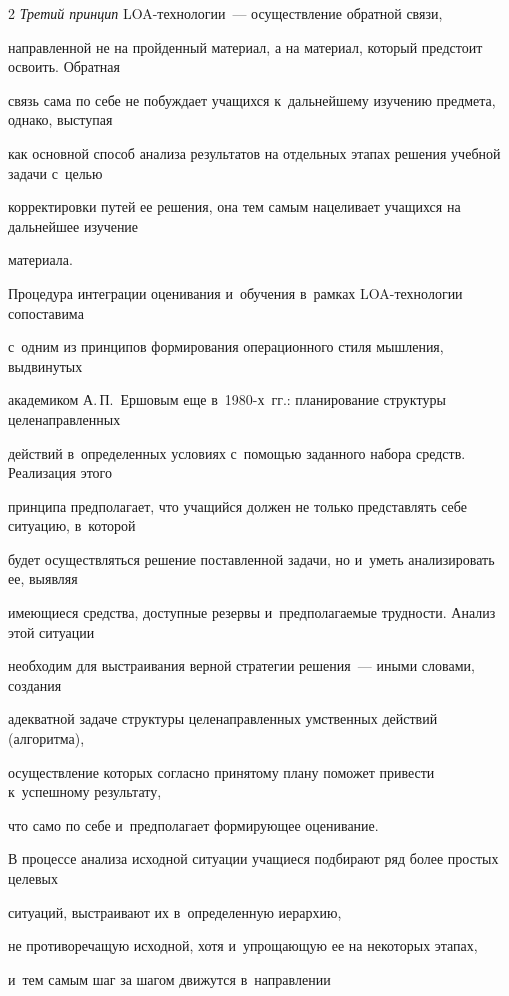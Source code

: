 \begin{multicols}{2}
  \textit{Третий принцип} LOA-тех\-но\-ло\-гии~--- осуществление обратной связи,


направленной не на пройденный материал, а на материал, который предстоит освоить. Обратная


связь сама по себе не побуждает учащихся к~дальнейшему изучению предмета, однако, выступая


как основной способ анализа результатов на отдельных этапах решения учебной задачи с~целью


корректировки путей ее решения, она тем самым нацеливает учащихся на дальнейшее изучение


материала.





  Процедура интеграции оценивания и~обучения в~рамках LOA-тех\-но\-ло\-гии сопоставима


с~одним из принципов формирования операционного стиля мышления, выдвинутых


академиком А.\,П.~Ершовым еще в~1980-х~гг.: планирование структуры целенаправленных


действий в~определенных условиях с~помощью заданного набора средств. Реализация этого


принципа предполагает, что учащийся должен не только представлять себе ситуацию, в~которой


будет осуществляться решение поставленной задачи, но и~уметь анализировать ее, выявляя


имеющиеся средства, доступные резервы и~предполагаемые трудности. Анализ этой ситуации


необходим для выстраивания верной стратегии решения~--- иными словами, создания


адекватной задаче структуры целенаправленных умственных действий (алгоритма),


осуществление которых согласно принятому плану поможет привести к~успешному результату,


что само по себе и~предполагает формирующее оценивание.





  В процессе анализа исходной ситуации учащиеся подбирают ряд более простых целевых


ситуаций, выстраивают их в~определенную иерархию, 


не противоречащую исходной, хотя и~упрощающую ее на некоторых этапах, 


и~тем самым шаг за шагом движутся в~направлении



\end{multicols}
